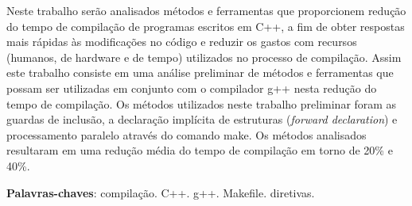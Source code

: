 \begin{resumo}
Neste trabalho serão analisados métodos e ferramentas
 que proporcionem redução do tempo de compilação
 de programas escritos em C++, a fim de obter respostas mais
 rápidas às modificações no código e reduzir os gastos com recursos
 (humanos, de hardware e de tempo) utilizados no processo
 de compilação. Assim este trabalho consiste em uma
 análise preliminar de métodos e ferramentas que possam
 ser utilizadas em conjunto com o compilador g++ 
 nesta redução do tempo de compilação. Os métodos utilizados
 neste trabalho preliminar foram as guardas de inclusão,
 a declaração implícita de estruturas (\textit{forward declaration})
 e processamento paralelo através do comando make.
 Os métodos analisados resultaram em uma redução média 
 do tempo de compilação em torno de 20\% e 40\%.

 \vspace{\onelineskip}
    
 \noindent
 \textbf{Palavras-chaves}: compilação. C++. g++. Makefile. diretivas.

\end{resumo}
